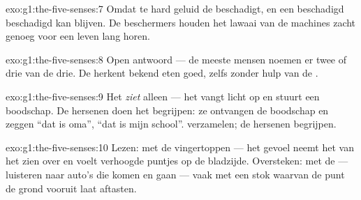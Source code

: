 \begin{solution}{exo:g1:the-five-senses:7}
Omdat te hard geluid de  beschadigt, en een beschadigd 
beschadigd kan blijven. De beschermers houden het lawaai van de
machines zacht genoeg voor een leven lang horen.
\end{solution}

\begin{solution}{exo:g1:the-five-senses:8}
Open antwoord --- de meeste mensen noemen er twee of drie van de drie.
De  herkent bekend eten goed, zelfs zonder hulp van de .
\end{solution}

\begin{solution}{exo:g1:the-five-senses:9}
Het  \emph{ziet} alleen --- het vangt licht op en stuurt een
boodschap. De hersenen doen het begrijpen: ze ontvangen de boodschap en
zeggen ``dat is oma'', ``dat is mijn school''.  verzamelen; de
hersenen begrijpen.
\end{solution}

\begin{solution}{exo:g1:the-five-senses:10}
Lezen: met de vingertoppen --- het gevoel neemt het van het zien over
en voelt verhoogde puntjes op de bladzijde. Oversteken: met de  ---
luisteren naar auto's die komen en gaan --- vaak met een stok waarvan
de punt de grond vooruit laat aftasten.
\end{solution}
